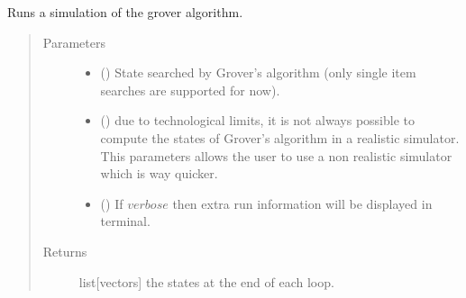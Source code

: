 \documentclass[letterpaper,10pt,english]{sphinxmanual}
\begin{document}
\begin{fulllineitems}
\label{\detokenize{grover:grover.grover_run}}
Runs a simulation of the grover algorithm.
\begin{quote}\begin{description}
\item[{Parameters}] \leavevmode\begin{itemize}
\item {} 
 (\sphinxstyleliteralemphasis{\sphinxupquote{{[}}}\sphinxstyleliteralemphasis{\sphinxupquote{{]}}}) \textendash{} State searched by Grover’s algorithm 
(only single item searches are supported for now).

\item {} 
 () \textendash{} due to technological limits, it is not always possible 
to compute the states of Grover’s algorithm in a realistic simulator. This 
parameters allows the user to use a non realistic simulator which is way 
quicker.

\item {} 
 () \textendash{} If \(verbose\) then extra run information will be displayed 
in terminal.

\end{itemize}

\item[{Returns}] \leavevmode
list{[}vectors{]} \textendash{} the states at the end of each loop.

\end{description}\end{quote}

\end{fulllineitems}

\end{document}
